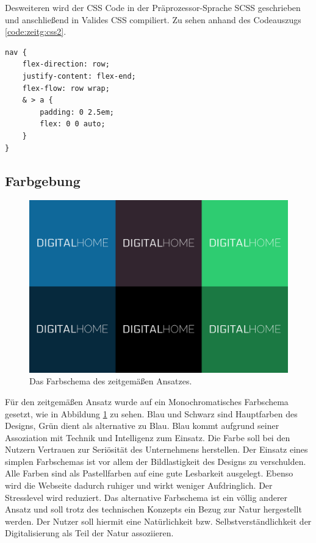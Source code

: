 Desweiteren wird der CSS Code in der Präprozessor-Sprache SCSS geschrieben und anschließend in Valides CSS compiliert. Zu sehen anhand des Codeauszugs \ref{code:zeitg:css2}.

\begin{lstlisting}[caption=Verschachtelung von CSS-Klassen in SCSS., label=code:zeitg:css2]
nav {
	flex-direction: row;
	justify-content: flex-end;
	flex-flow: row wrap;
	& > a {
		padding: 0 2.5em;
		flex: 0 0 auto;
	}
}
\end{lstlisting}

\subsection{Farbgebung}
\begin{figure} [hp]
	\includegraphics[width=\textwidth]{./img/zeitg_farbschema1.png}
	\caption{Das Farbschema des zeitgemäßen Ansatzes.}
	\label{zeitg:farbschema}
\end{figure}

Für den zeitgemäßen Ansatz wurde auf ein Monochromatisches Farbschema gesetzt, wie in Abbildung \ref{zeitg:farbschema} zu sehen. Blau und Schwarz sind Hauptfarben des Designs, Grün dient als alternative zu Blau.
Blau kommt aufgrund seiner Assoziation mit Technik und Intelligenz zum Einsatz. Die Farbe soll bei den Nutzern Vertrauen zur Seriösität des Unternehmens herstellen. Der Einsatz eines simplen Farbschemas ist vor allem der Bildlastigkeit des Designs zu verschulden.
Alle Farben sind als Pastellfarben auf eine gute Lesbarkeit ausgelegt. Ebenso wird die Webseite dadurch ruhiger und wirkt weniger Aufdringlich. Der Stresslevel wird reduziert.
Das alternative Farbschema ist ein völlig anderer Ansatz und soll trotz des technischen Konzepts ein Bezug zur Natur hergestellt werden. Der Nutzer soll hiermit eine Natürlichkeit bzw. Selbstverständlichkeit der Digitalisierung als Teil der Natur assoziieren.

